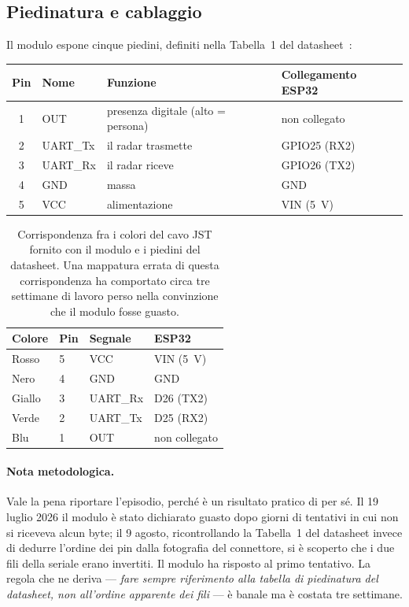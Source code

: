 \subsection{Piedinatura e cablaggio}
\label{sec:cablaggio}

Il modulo espone cinque piedini, definiti nella Tabella~1 del
datasheet~\cite{ld2410bDatasheet}:

\begin{center}\small
\begin{tabular}{@{}clll@{}}
\toprule
\textbf{Pin} & \textbf{Nome} & \textbf{Funzione} & \textbf{Collegamento ESP32} \\
\midrule
1 & OUT & presenza digitale (alto = persona) & non collegato \\
2 & UART\_Tx & il radar trasmette & GPIO25 (RX2) \\
3 & UART\_Rx & il radar riceve & GPIO26 (TX2) \\
4 & GND & massa & GND \\
5 & VCC & alimentazione & VIN (5~V) \\
\bottomrule
\end{tabular}
\end{center}

\begin{table}[htbp]
\centering
\caption{Corrispondenza fra i colori del cavo JST fornito con il modulo e i piedini
del datasheet. Una mappatura errata di questa corrispondenza ha comportato circa tre
settimane di lavoro perso nella convinzione che il modulo fosse guasto.}
\label{tab:colori}
\small
\begin{tabular}{@{}llll@{}}
\toprule
\textbf{Colore} & \textbf{Pin} & \textbf{Segnale} & \textbf{ESP32} \\
\midrule
Rosso & 5 & VCC & VIN (5~V) \\
Nero & 4 & GND & GND \\
Giallo & 3 & UART\_Rx & D26 (TX2) \\
Verde & 2 & UART\_Tx & D25 (RX2) \\
Blu & 1 & OUT & non collegato \\
\bottomrule
\end{tabular}
\end{table}

\paragraph{Nota metodologica.} Vale la pena riportare l'episodio, perché è un
risultato pratico di per sé. Il 19 luglio 2026 il modulo è stato dichiarato
guasto dopo giorni di tentativi in cui non si riceveva alcun byte; il 9 agosto,
ricontrollando la Tabella~1 del datasheet invece di dedurre l'ordine dei pin dalla
fotografia del connettore, si è scoperto che i due fili della seriale erano
invertiti. Il modulo ha risposto al primo tentativo. La regola che ne deriva ---
\emph{fare sempre riferimento alla tabella di piedinatura del datasheet, non
all'ordine apparente dei fili} --- è banale ma è costata tre settimane.

